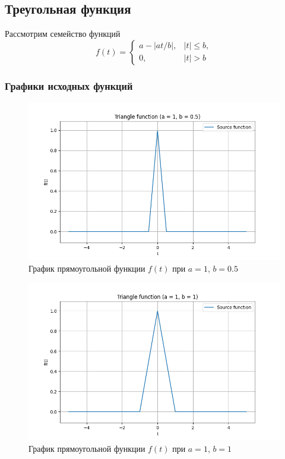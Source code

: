 \subsection{Треугольная функция}

Рассмотрим семейство функций
\begin{equation}
    f(t) = \begin{cases}
        a - |at / b|, & |t| \le b, \\
        0, & |t| > b
    \end{cases}
    \label{eq:triangle_function}
\end{equation}

\subsubsection{Графики исходных функций}

\begin{figure}[ht!]
    \centering
    \includegraphics[width=\textwidth]{media/triangle_1.png}
    \caption{График прямоугольной функции $f(t)$ при $a = 1$, $b = 0.5$}
    \label{fig:triangle_1}
\end{figure}

\begin{figure}[ht!]
    \centering
    \includegraphics[width=\textwidth]{media/triangle_2.png}
    \caption{График прямоугольной функции $f(t)$ при $a = 1$, $b = 1$}
    \label{fig:triangle_2}
\end{figure}

